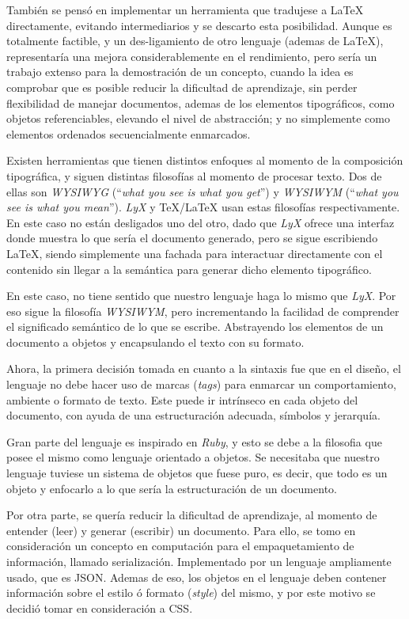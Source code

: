 \documentclass[12pt,letterpaper,titlepage,oneside,openright]{book}
\newcommand{\latex}{\LaTeX\xspace}
\newcommand{\tex}{\TeX\xspace}
\newcommand{\ruby}{\textit{Ruby}\xspace}
\newcommand{\lyx}{\textit{LyX}\xspace}
\begin{document}
También se pensó en implementar un herramienta que tradujese a \latex
directamente, evitando intermediarios y se descarto esta posibilidad. Aunque es
totalmente factible, y un des-ligamiento de otro lenguaje (ademas de \latex),
representaría una mejora considerablemente en el rendimiento, pero sería un
trabajo extenso para la demostración de un concepto, cuando la idea es comprobar
que es posible reducir la dificultad de aprendizaje, sin perder flexibilidad de
manejar documentos, ademas de los elementos tipográficos, como objetos
referenciables, elevando el nivel de abstracción; y no simplemente como
elementos ordenados secuencialmente enmarcados.

Existen herramientas que tienen distintos enfoques al momento de la composición
tipográfica, y siguen distintas filosofías al momento de procesar texto. Dos de
ellas son \textit{WYSIWYG} (``\textit{what you see is what you get}'') y
\textit{WYSIWYM} (``\textit{what you see is what you mean}''). \lyx y 
\tex/\latex usan estas filosofías respectivamente. En este caso no están
desligados uno del otro, dado que \lyx ofrece una interfaz donde muestra lo que
sería el documento generado, pero se sigue escribiendo \latex, siendo
simplemente una fachada para interactuar directamente con el contenido sin
llegar a la semántica para generar dicho elemento tipográfico.

En este caso, no tiene sentido que nuestro lenguaje haga lo mismo que
\lyx. Por eso sigue la filosofía \textit{WYSIWYM}, pero incrementando la
facilidad de comprender el significado semántico de lo que se escribe.
Abstrayendo los elementos de un documento a objetos y encapsulando el texto con
su formato.

Ahora, la primera decisión tomada en cuanto a la sintaxis fue que en el diseño,
el lenguaje no debe hacer uso de marcas (\textit{tags}) para enmarcar un
comportamiento, ambiente o formato de texto. Este puede ir intrínseco en cada
objeto del documento, con ayuda de una estructuración adecuada, símbolos y
jerarquía.

Gran parte del lenguaje es inspirado en \ruby, y esto se debe a la filosofia que
posee el mismo como lenguaje orientado a objetos. Se necesitaba que nuestro
lenguaje tuviese un sistema de objetos que fuese puro, es decir, que todo es un
objeto y enfocarlo a lo que sería la estructuración de un documento.

Por otra parte, se quería reducir la dificultad de aprendizaje, al momento de
entender (leer) y generar (escribir) un documento. Para ello, se tomo en
consideración un concepto en computación para el empaquetamiento de información,
llamado serialización. Implementado por un lenguaje ampliamente usado, que es
JSON. Ademas de eso, los objetos en el lenguaje deben contener información sobre
el estilo ó formato (\textit{style}) del mismo, y por este motivo se decidió
tomar en consideración a CSS.
\end{document}
